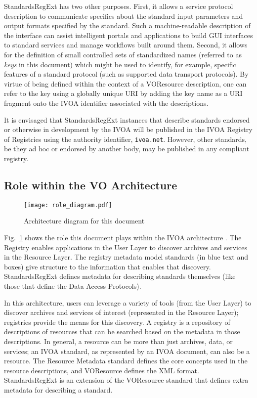 \documentclass[11pt,a4paper]{ivoa}
\begin{document}
StandardsRegExt has two other purposes.  First, it allows a service
protocol description to communicate specifics about the standard input
parameters and output formats specified by the standard.  Such a
machine-readable description of the interface can assist intelligent
portals and applications to build GUI interfaces to standard services
and manage workflows built around them.  Second, it allows for the
definition of small controlled sets of standardized names (referred to
as \emph{keys} in this document) which might be used to identify,
for example, specific features of a standard protocol (such as
supported data transport protocols).  By virtue of being defined
within the context of a VOResource description, one can refer to the
key using a globally unique URI by adding the key name as a URI fragment
onto the IVOA identifier associated with the
descriptions.  



It is envisaged that StandardsRegExt instances that describe standards
endorsed or otherwise in development by the IVOA will be published in
the IVOA Registry of Registries \citep{2007ivoa.rept.0628P} using the
authority identifier, \texttt{ivoa.net}.
However, other standards, be they ad hoc or endorsed by another
body, may be published in any compliant registry.



\subsection{Role within the VO Architecture}

\begin{figure}
\centering
\texttt{[image: role\_diagram.pdf]}
\caption{Architecture diagram for this document}
\label{fig:archdiag}
\end{figure}

Fig.~\ref{fig:archdiag} shows the role this document plays within the
IVOA architecture \citep{2010ivoa.rept.1123A}.
The Registry enables applications in the User Layer to discover
archives and services in the Resource Layer.  The registry metadata
model standards (in blue text and boxes) give structure to the
information that enables that discovery.  StandardsRegExt defines metadata
for describing standards themselves (like those that define the Data
Access Protocols).  



In this architecture, users can leverage a variety of tools (from the
User Layer) to discover archives and services of interest (represented
in the Resource Layer); registries provide the means for this
discovery. A registry is a repository of descriptions of resources
that can be searched based on the metadata in those descriptions. In
general, a resource can be more than just archives, data, or
services; an IVOA standard, as represented by an IVOA document, can
also be a resource.  The Resource Metadata standard
defines the core concepts used in the resource
descriptions, and VOResource defines
the XML format.  StandardsRegExt is an extension of the VOResource
standard that defines extra metadata for describing a standard.  
\end{document}
